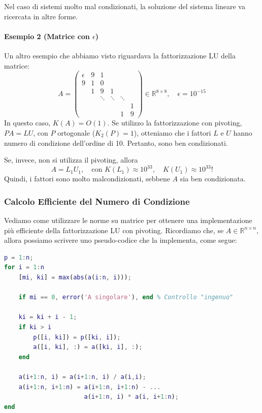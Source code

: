 \begin{osservazione}
Nel caso di sistemi molto mal condizionati, la soluzione del sistema lineare va ricercata in altre forme.
\end{osservazione}

\paragraph{Esempio 2 (Matrice con $\epsilon$)}
Un altro esempio che abbiamo visto riguardava la fattorizzazione LU della matrice:
$$ 
A = 
\begin{pmatrix} 
\epsilon & 9 & 1 & & & \\
9 & 1 & 0 & & & \\
& 1 & 9 & 1 & & \\
& & \ddots & \ddots & \ddots & \\
& & &  & & 1 \\
& & & & 1 & 9
\end{pmatrix} \in \mathbb{R}^{8 \times 8}, \quad \epsilon = 10^{-15}
$$
In questo caso, $K(A) = O(1)$.
Se utilizzo la fattorizzazione con pivoting, $PA=LU$, con $P$ ortogonale ($K_2(P)=1$), otteniamo che i fattori $L$ e $U$ hanno numero di condizione dell'ordine di 10. Pertanto, sono ben condizionati.

Se, invece, non si utilizza il pivoting, allora
$$ A = L_1 U_1, \quad \text{con } K(L_1) \approx 10^{33}, \quad K(U_1) \approx 10^{33}! $$
Quindi, i fattori sono molto malcondizionati, sebbene $A$ sia ben condizionata.
\subsubsection{Calcolo Efficiente del Numero di Condizione}
Vediamo come utilizzare le norme su matrice per ottenere una implementazione più efficiente della fattorizzazione LU con pivoting.
Ricordiamo che, se $A \in \mathbb{R}^{n \times n}$, allora possiamo scrivere uno pseudo-codice che la implementa, come segue:

\begin{lstlisting}[language=matlab, frame=none, numbers=none]
p = 1:n;
for i = 1:n
    [mi, ki] = max(abs(a(i:n, i)));
    
    if mi == 0, error('A singolare'), end % Controllo "ingenuo"
    
    ki = ki + i - 1;
    if ki > i
        p([i, ki]) = p([ki, i]);
        a([i, ki], :) = a([ki, i], :);
    end
    
    a(i+1:n, i) = a(i+1:n, i) / a(i,i);
    a(i+1:n, i+1:n) = a(i+1:n, i+1:n) - ...
                      a(i+1:n, i) * a(i, i+1:n);
end
\end{lstlisting}

